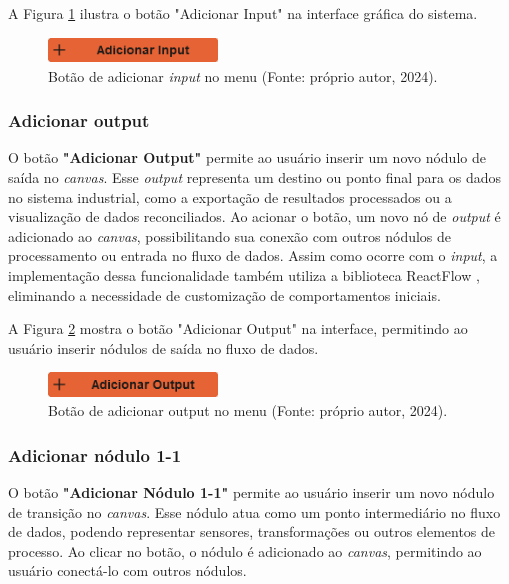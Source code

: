 A Figura \ref{Fig:AddInputButton} ilustra o botão "Adicionar Input" na interface gráfica do sistema.

\begin{figure}[htbp]
    \centering
    \includegraphics[width=0.4\textwidth]{figuras/add-input-button.png}
    \caption{Botão de adicionar \textit{input} no menu (Fonte: próprio autor, 2024).}
    \label{Fig:AddInputButton}
\end{figure}

\subsubsection{Adicionar output}

O botão \textbf{"Adicionar Output"} permite ao usuário inserir um novo nódulo de saída no \textit{canvas}. Esse \textit{output} representa um destino ou ponto final para os dados no sistema industrial, como a exportação de resultados processados ou a visualização de dados reconciliados. Ao acionar o botão, um novo nó de \textit{output} é adicionado ao \textit{canvas}, possibilitando sua conexão com outros nódulos de processamento ou entrada no fluxo de dados. Assim como ocorre com o \textit{input}, a implementação dessa funcionalidade também utiliza a biblioteca ReactFlow \cite{reactflow}, eliminando a necessidade de customização de comportamentos iniciais.

A Figura \ref{Fig:AddOutputButton} mostra o botão "Adicionar Output" na interface, permitindo ao usuário inserir nódulos de saída no fluxo de dados.

\begin{figure}[htbp]
    \centering
    \includegraphics[width=0.4\textwidth]{figuras/add-output-button.png}
    \caption{Botão de adicionar output no menu (Fonte: próprio autor, 2024).}
    \label{Fig:AddOutputButton}
\end{figure}

\subsubsection{Adicionar nódulo 1-1}

O botão \textbf{"Adicionar Nódulo 1-1"} permite ao usuário inserir um novo nódulo de transição no \textit{canvas}. Esse nódulo atua como um ponto intermediário no fluxo de dados, podendo representar sensores, transformações ou outros elementos de processo. Ao clicar no botão, o nódulo é adicionado ao \textit{canvas}, permitindo ao usuário conectá-lo com outros nódulos.


